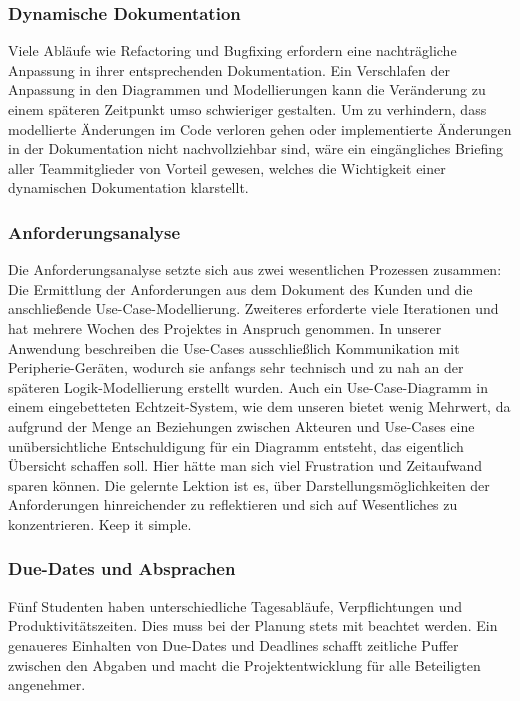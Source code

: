 \subsubsection{Dynamische Dokumentation}
Viele Abläufe wie Refactoring und Bugfixing erfordern eine nachträgliche Anpassung in ihrer entsprechenden
Dokumentation.
Ein Verschlafen der Anpassung in den Diagrammen und Modellierungen kann die Veränderung zu einem
späteren Zeitpunkt umso schwieriger gestalten.
Um zu verhindern, dass modellierte Änderungen im Code verloren gehen oder implementierte Änderungen
in der Dokumentation nicht nachvollziehbar sind, wäre ein eingängliches Briefing aller Teammitglieder von Vorteil
gewesen, welches die Wichtigkeit einer dynamischen Dokumentation klarstellt.

\subsubsection{Anforderungsanalyse}
Die Anforderungsanalyse setzte sich aus zwei wesentlichen Prozessen zusammen:
Die Ermittlung der Anforderungen aus dem Dokument des Kunden und die anschließende Use-Case-Modellierung.
Zweiteres erforderte viele Iterationen und hat mehrere Wochen des Projektes in Anspruch genommen.
In unserer Anwendung beschreiben die Use-Cases ausschließlich Kommunikation mit Peripherie-Geräten,
wodurch sie anfangs sehr technisch und zu nah an der späteren Logik-Modellierung erstellt wurden.
Auch ein Use-Case-Diagramm in einem eingebetteten Echtzeit-System, wie dem unseren bietet wenig Mehrwert,
da aufgrund der Menge an Beziehungen zwischen Akteuren und Use-Cases eine unübersichtliche Entschuldigung
für ein Diagramm entsteht, das eigentlich Übersicht schaffen soll.
Hier hätte man sich viel Frustration und Zeitaufwand sparen können.
Die gelernte Lektion ist es, über Darstellungsmöglichkeiten der Anforderungen hinreichender zu reflektieren
und sich auf Wesentliches zu konzentrieren.
Keep it simple.

\subsubsection{Due-Dates und Absprachen}
Fünf Studenten haben unterschiedliche Tagesabläufe, Verpflichtungen und Produktivitätszeiten.
Dies muss bei der Planung stets mit beachtet werden.
Ein genaueres Einhalten von Due-Dates und Deadlines schafft zeitliche Puffer zwischen den Abgaben
und macht die Projektentwicklung für alle Beteiligten angenehmer.

\subsubsection{}